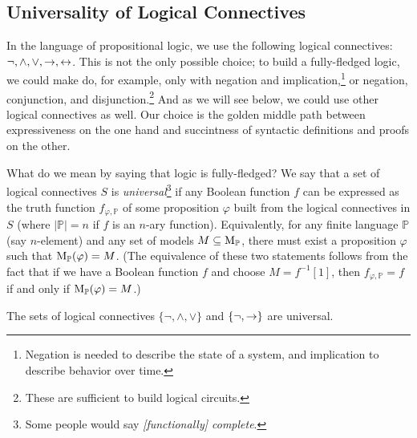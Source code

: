 \subsection{Universality of Logical Connectives}

In the language of propositional logic, we use the following logical connectives: $\neg, \land, \lor, \mathbin{\rightarrow}, \mathbin{\leftrightarrow}$. This is not the only possible choice; to build a fully-fledged logic, we could make do, for example, only with negation and implication,\footnote{Negation is needed to describe the state of a system, and implication to describe behavior over time.} or negation, conjunction, and disjunction.\footnote{These are sufficient to build logical circuits.} And as we will see below, we could use other logical connectives as well. Our choice is the golden middle path between expressiveness on the one hand and succintness of syntactic definitions and proofs on the other.

What do we mean by saying that logic is fully-fledged? We say that a set of logical connectives $S$ is \emph{universal}\footnote{Some people would say \emph{[functionally] complete}.} if any Boolean function $f$ can be expressed as the truth function $f_{\varphi,\mathbb P}$ of some proposition $\varphi$ built from the logical connectives in $S$ (where $|\mathbb P|=n$ if $f$ is an $n$-ary function). Equivalently, for any finite language $\mathbb P$ (say $n$-element) and any set of models $M \subseteq \operatorname{M}_\mathbb P$, there must exist a proposition $\varphi$ such that $\operatorname{M}_\mathbb P(\varphi) = M$. (The equivalence of these two statements follows from the fact that if we have a Boolean function $f$ and choose $M = f^{-1}[1]$, then $f_{\varphi,\mathbb P} = f$ if and only if $\operatorname{M}_\mathbb P(\varphi) = M$.)

\begin{proposition} \label{proposition:not-and-or-is-universal}
    The sets of logical connectives $\{\neg, \land, \lor\}$ and $\{\neg, \mathbin{\rightarrow}\}$ are universal.
\end{proposition}

